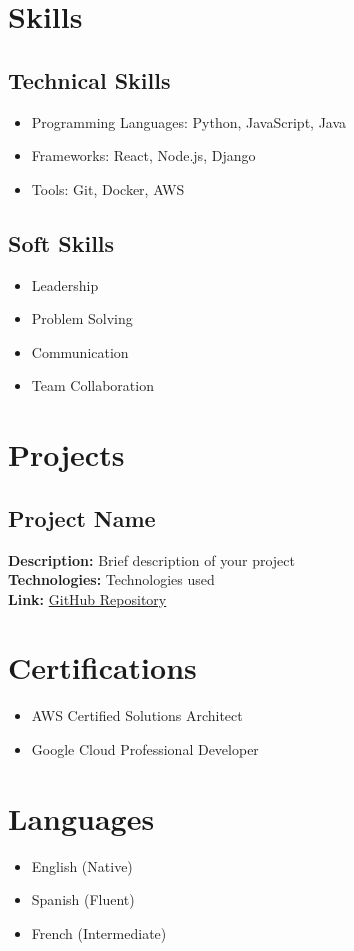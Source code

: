 \documentclass{article}
\begin{document}
\section{Skills}
\subsection{Technical Skills}
\begin{itemize}
    \item Programming Languages: Python, JavaScript, Java
    \item Frameworks: React, Node.js, Django
    \item Tools: Git, Docker, AWS
\end{itemize}

\subsection{Soft Skills}
\begin{itemize}
    \item Leadership
    \item Problem Solving
    \item Communication
    \item Team Collaboration
\end{itemize}

\section{Projects}
\subsection{Project Name}
\textbf{Description:} Brief description of your project \\
\textbf{Technologies:} Technologies used \\
\textbf{Link:} \href{https://github.com/yourusername/project}{GitHub Repository}

\section{Certifications}
\begin{itemize}
    \item AWS Certified Solutions Architect
    \item Google Cloud Professional Developer
\end{itemize}

\section{Languages}
\begin{itemize}
    \item English (Native)
    \item Spanish (Fluent)
    \item French (Intermediate)
\end{itemize}
\end{document}
